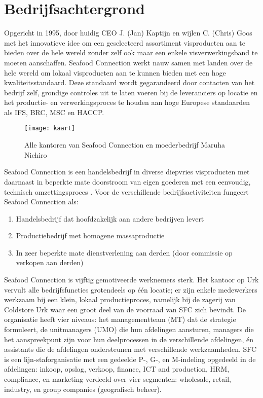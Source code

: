 
\chapter{Bedrijfsachtergrond}
Opgericht in 1995, door huidig CEO J. (Jan) Kaptijn en wijlen C. (Chris) Goos met het innovatieve idee om een geselecteerd assortiment visproducten aan te bieden over de hele wereld zonder zelf ook maar een enkele visverwerkingsband te moeten aanschaffen. Seafood Connection werkt nauw samen met landen over de hele wereld om lokaal visproducten aan te kunnen bieden met een hoge kwaliteitsstandaard. Deze standaard wordt gegarandeerd door contacten van het bedrijf zelf, grondige controles uit te laten voeren bij de leveranciers op locatie en het productie- en verwerkingsproces te houden aan hoge Europese standaarden als IFS, BRC, MSC en HACCP. \citep{sfcreglement}

\begin{figure}[!h]
    \centering
    \texttt{[image: kaart]}
    \caption{Alle kantoren van Seafood Connection en moederbedrijf Maruha Nichiro \citep{sfcwebsite}}
    \label{fig:kantorensfc}
\end{figure}

Seafood Connection is een handelsbedrijf in diverse diepvries visproducten met daarnaast in beperkte mate doorstroom van eigen goederen met een eenvoudig, technisch omzettingsproces \citep{aoibsfc}. Voor de verschillende bedrijfsactiviteiten fungeert Seafood Connection als:

\begin{enumerate}
    \item Handelsbedrijf dat hoofdzakelijk aan andere bedrijven levert
    \item Productiebedrijf met homogene massaproductie
    \item In zeer beperkte mate dienstverlening aan derden (door commissie op verkopen aan derden)
\end{enumerate}

Seafood Connection is vijftig gemotiveerde werknemers sterk. Het kantoor op Urk vervult alle bedrijfsfuncties grotendeels op één locatie; er zijn enkele medewerkers werkzaam bij een klein, lokaal productieproces, namelijk bij de zagerij van Coldstore Urk waar een groot deel van de voorraad van SFC zich bevindt. De organisatie heeft vier niveaus: het managementteam (MT) dat de strategie formuleert, de unitmanagers (UMO) die hun afdelingen aansturen, managers die het aanspreekpunt zijn voor hun deelprocessen in de verschillende afdelingen, én assistants die de afdelingen ondersteunen met verschillende werkzaamheden. SFC is een lijn-staforganisatie met een gedeelde P-, G-, en M-indeling opgedeeld in de afdelingen: inkoop, opslag, verkoop, finance, ICT and production, HRM, compliance, en marketing verdeeld over vier segmenten: wholesale, retail, industry, en group companies (geografisch beheer). \citep{quickscan,sfcreglement}

